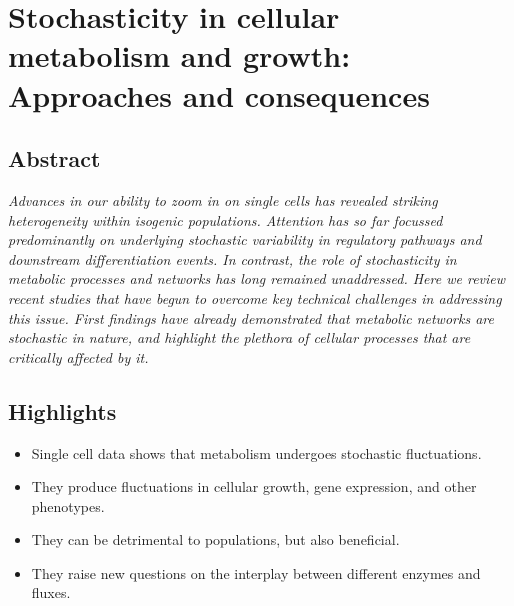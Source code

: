 \chapter{Stochasticity in cellular metabolism and growth: Approaches and consequences}
\label{chapter:literaturereview}



\section*{Abstract}
\textit{
Advances in our ability to zoom in on single cells has revealed striking heterogeneity within isogenic populations. Attention has so far focussed predominantly on underlying stochastic variability in regulatory pathways and downstream differentiation events. In contrast, the role of stochasticity in metabolic processes and networks has long remained unaddressed. Here we review recent studies that have begun to overcome key technical challenges in addressing this issue. First findings have already demonstrated that metabolic networks are stochastic in nature, and highlight the plethora of cellular processes that are critically affected by it.
}

\section*{Highlights}
\begin{itemize}[itemsep=1pt,parsep=1pt]
\item Single cell data shows that metabolism undergoes stochastic fluctuations.
\item They produce fluctuations in cellular growth, gene expression, and other phenotypes.
\item They can be detrimental to populations, but also beneficial.
\item They raise new questions on the interplay between different enzymes and fluxes.
\end{itemize}

